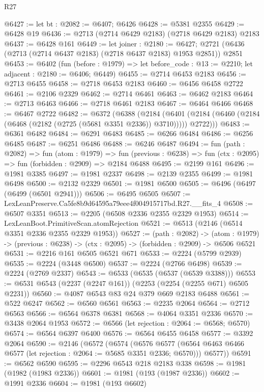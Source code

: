\begin{lexlean}{R27}
\begin{coremodule}
@6427 := let bt : @2082 := @6407; @6426
@6428 := @5381 @2355
@6429 := @6428 @19
@6436 := @2713 (@2714 @6429 @2183) (@2718 @6429 @2183) @2183
@6437 := @6428 @161
@6449 := let joiner : @2180 := @6427;
  @2721 (@6436 (@2713 (@2714 @6437 @2183) (@2718 @6437 @2183) @1953 @2851)) @2851
@6453 := @6402
    (fun (before : @1979) => let before_code : @13 := @2210; let adjacent : @2180 := @6406; @6449)
@6455 := @2714 @6453 @2183
@6456 := @2713 @6455
@6458 := @2718 @6453 @2183
@6460 := @6456 @6458 @2722
@6461 := @2106 @2329
@6462 := @2714 @6461
@6463 := @6462 @2183
@6464 := @2713 @6463
@6466 := @2718 @6461 @2183
@6467 := @6464 @6466
@6468 := @6467 @2722
@6482 := @6372
    (@6388
      (@2184
        (@6401 (@2184 (@6460 (@2184 (@6468 (@2182 (@2725 (@5681 @3351 @2336)) @3710))))) @2722)))
@6483 := @6361 @6482
@6484 := @6291 @6483
@6485 := @6266 @6484
@6486 := @6256 @6485
@6487 := @6251 @6486
@6488 := @6246 @6487
@6494 := fun (path : @2082) =>
  fun (atom : @1979) =>
  fun (previous : @6238) => fun (ctx : @2095) => fun (forbidden : @2909) => @2184 @6488
@6495 := @2199 @161
@6496 := @1981 @3385
@6497 := @1981 @2337
@6498 := @2139 @2355
@6499 := @1981 @6498
@6500 := @2132 @2329
@6501 := @1981 @6500
@6505 := @6496 (@6497 (@6499 (@6501 @2941)))
@6506 := @6495 @6505
@6507 := LexLeanPreserve.Ca5fe8b9d64595a79eee4f004915717bd.R27.__fits_4
@6508 := @6507 @3351
@6513 := @2205 (@6508 @2336 @2355 @2329 @1953)
@6514 := LexLeanBoot.PrimitiveScan.atomRejection
@6521 := @6513 (@2146 (@6514 @3351 @2336 @2355 @2329 @1953))
@6527 := (path : @2082) ->
  (atom : @1979) -> (previous : @6238) -> (ctx : @2095) -> (forbidden : @2909) -> @6506 @6521
@6531 := @2216 @161 @6505 @6521 @671
@6533 := @2224 (@5799 @2939)
@6535 := @2224 (@3448 @6500)
@6537 := @2224 (@2766 @6498)
@6539 := @2224 (@2769 @2337)
@6543 := @6533 (@6535 (@6537 (@6539 @3388)))
@6553 := @6531 @6543 (@2237 (@2247 @161)) (@2253 (@2254 (@2255 @671) @6505 @2231))
@6560 := @4087 @6543 @83 @24 @379 @669 @2183 @6488
@6561 := @522 @6247
@6562 := @6560 @6561
@6563 := @2235 @2064
@6564 := @2712 @6563
@6566 := @6564 @6378 @6381
@6568 := @4064 @3351 @2336
@6570 := @3438 @2064 @1953
@6572 := @6566 (let rejection : @2064 := @6568; @6570)
@6574 := @6564 @6397 @6400
@6576 := @6564 @6455 @6458
@6577 := @3392 @2064
@6590 := @2146
    (@6572
      (@6574
        (@6576 @6577 (@6564 @6463 @6466 @6577 (let rejection : @2064 := @5685 @3351 @2336; @6570)))
        @6577))
@6591 := @6562 @6590
@6595 := @2296 @6543 @218 @2183 @338
@6598 := @1981 (@1982 (@1983 @2336))
@6601 := @1981 (@193 (@1987 @2336))
@6602 := @1991 @2336
@6604 := @1981 (@193 @6602)

\end{coremodule}
\end{lexlean}
